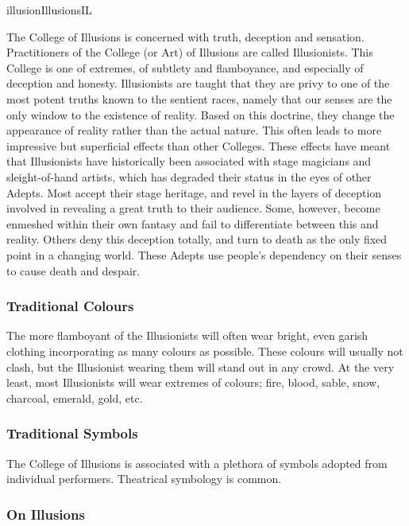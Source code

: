 \begin{college}[1.4]{illusion}{Illusions}{IL}

The College of Illusions is concerned with truth, deception and
sensation. Practitioners of the College (or Art) of Illusions are
called Illusionists. This College is one of extremes, of subtlety and
flamboyance, and especially of deception and honesty. Illusionists are
taught that they are privy to one of the most potent truths known to
the sentient races, namely that our senses are the only window to the
existence of reality. Based on this doctrine, they change the
appearance of reality rather than the actual nature. This often leads
to more impressive but superficial effects than other Colleges. These
effects have meant that Illusionists have historically been associated
with stage magicians and sleight-of-hand artists, which has degraded
their status in the eyes of other Adepts. Most accept their stage
heritage, and revel in the layers of deception involved in revealing a
great truth to their audience. Some, however, become enmeshed within
their own fantasy and fail to differentiate between this and
reality. Others deny this deception totally, and turn to death as the
only fixed point in a changing world. These Adepts use people's
dependency on their senses to cause death and despair.

\subsubsection{Traditional Colours}

The more flamboyant of the Illusionists will often wear bright, even
garish clothing incorporating as many colours as possible. These
colours will usually not clash, but the Illusionist wearing them will
stand out in any crowd. At the very least, most Illusionists will wear
extremes of colours; fire, blood, sable, snow, charcoal, emerald,
gold, etc.

\subsubsection{Traditional Symbols}

The College of Illusions is associated with a plethora of symbols
adopted from individual performers. Theatrical symbology is common.


\subsubsection{On Illusions}


\end{college}

